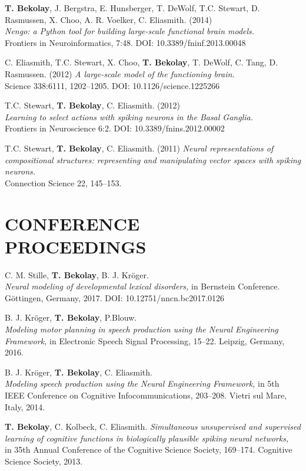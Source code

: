 \documentclass[line,margin]{res}
\begin{document}
\begin{resume}
\textbf{T. Bekolay}, J. Bergstra, E. Hunsberger, T. DeWolf, T.C. Stewart,
  D. Rasmussen, X. Choo, A. R. Voelker, C. Eliasmith. (2014) \\
  {\sl Nengo: a Python tool for building large-scale functional
  brain models.} \\ Frontiers in Neuroinformatics, 7:48.
  DOI: 10.3389/fninf.2013.00048

C. Eliasmith, T.C. Stewart, X. Choo, \textbf{T. Bekolay},
  T. DeWolf, C. Tang, D. Rasmussen. (2012)
  {\sl A large-scale model of the functioning brain.} \\
  Science 338:6111, 1202--1205. DOI: 10.1126/science.1225266

T.C. Stewart, \textbf{T. Bekolay}, C. Eliasmith. (2012) \\
  {\sl Learning to select actions with spiking neurons in the
  Basal Ganglia.} \\
  Frontiers in Neuroscience 6:2. DOI: 10.3389/fnins.2012.00002

T.C. Stewart, \textbf{T. Bekolay}, C. Eliasmith. (2011)
  {\sl Neural representations of compositional structures:
  representing and manipulating vector spaces with spiking neurons.} \\
  Connection Science 22, 145--153.

\section{CONFERENCE \\PROCEEDINGS}

C. M. Stille, \textbf{T. Bekolay}, B. J. Kr\"{o}ger. \\
  {\sl Neural modeling of developmental lexical disorders,}
  in Bernstein Conference.
  G\"{o}ttingen, Germany, 2017.
  DOI: 10.12751/nncn.bc2017.0126

B. J. Kr\"{o}ger, \textbf{T. Bekolay}, P.Blouw. \\
  {\sl Modeling motor planning in speech production using
    the Neural Engineering Framework,}
  in Electronic Speech Signal Processing, 15--22.
  Leipzig, Germany, 2016.

B. J. Kr\"{o}ger, \textbf{T. Bekolay}, C. Eliasmith. \\
  {\sl Modeling speech
  production using the Neural Engineering Framework,}
  in 5th IEEE Conference on Cognitive Infocommunications, 203--208.
  Vietri sul Mare, Italy, 2014.

\textbf{T. Bekolay}, C. Kolbeck, C. Eliasmith. {\sl Simultaneous
  unsupervised and supervised learning of cognitive functions
  in biologically plausible spiking neural networks,} \\ in 35th Annual
  Conference of the Cognitive Science Society, 169--174.
  Cognitive Science Society, 2013.


\end{resume}
\end{document}
